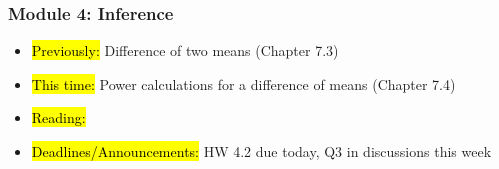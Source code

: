 
\begin{frame}
    \frametitle{Module 4: Inference}
    \begin{itemize}
        \item \hl{Previously: }Difference of two means (Chapter 7.3)
        \item \hl{This time: }Power calculations for a difference of means (Chapter 7.4)
        \item \hl{Reading: }
        \item \hl{Deadlines/Announcements: }HW 4.2 due today, Q3 in discussions this week
    \end{itemize}
    
\end{frame}